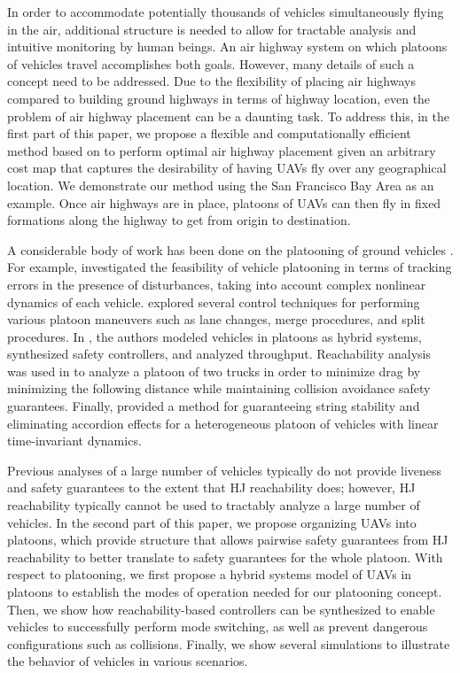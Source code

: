 In order to accommodate potentially thousands of vehicles simultaneously flying in the air, additional structure is needed to allow for tractable analysis and intuitive monitoring by human beings. An air highway system on which platoons of vehicles travel accomplishes both goals. However, many details of such a concept need to be addressed. Due to the flexibility of placing air highways compared to building ground highways in terms of highway location, even the problem of air highway placement can be a daunting task. To address this, in the first part of this paper, we propose a flexible and computationally efficient method based on \cite{Sethian96} to perform optimal air highway placement given an arbitrary cost map that captures the desirability of having UAVs fly over any geographical location. We demonstrate our method using the San Francisco Bay Area as an example. Once air highways are in place, platoons of UAVs can then fly in fixed formations along the highway to get from origin to destination.

A considerable body of work has been done on the platooning of ground vehicles \cite{Kavathekar11}. For example, \cite{McMahon90} investigated the feasibility of vehicle platooning in terms of tracking errors in the presence of disturbances, taking into account complex nonlinear dynamics of each vehicle.  \cite{Hedrick92} explored several control techniques for performing various platoon maneuvers such as lane changes, merge procedures, and split procedures. In \cite{Lygeros98}, the authors modeled vehicles in platoons as hybrid systems, synthesized safety controllers, and analyzed throughput. Reachability analysis was used in \cite{Alam11} to analyze a platoon of two trucks in order to minimize drag by minimizing the following distance while maintaining collision avoidance safety guarantees. Finally, \cite{Sabau16} provided a method for guaranteeing string stability and eliminating accordion effects for a heterogeneous platoon of vehicles with linear time-invariant dynamics.

Previous analyses of a large number of vehicles typically do not provide liveness and safety guarantees to the extent that HJ reachability does; however, HJ reachability typically cannot be used to tractably analyze a large number of vehicles. In the second part of this paper, we propose organizing UAVs into platoons, which provide structure that allows pairwise safety guarantees from HJ reachability to better translate to safety guarantees for the whole platoon. With respect to platooning, we first propose a hybrid systems model of UAVs in platoons to establish the modes of operation needed for our platooning concept. Then, we show how reachability-based controllers can be synthesized to enable vehicles to successfully perform mode switching, as well as prevent dangerous configurations such as collisions. Finally, we show several simulations to illustrate the behavior of vehicles in various scenarios.
